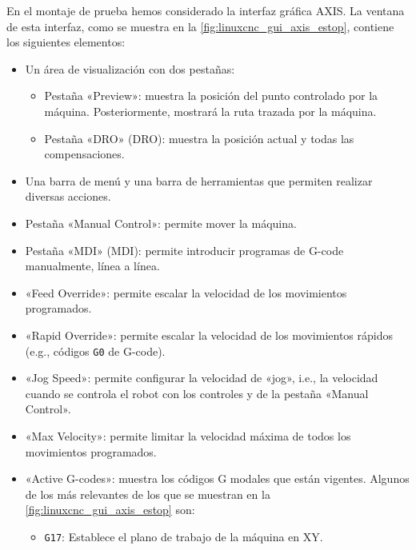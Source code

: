 \documentclass[english,spanish,a4paper,11pt]{article}
\begin{document}
En el montaje de prueba hemos considerado la interfaz gráfica AXIS. La ventana de esta interfaz, como se muestra en la \cref{fig:linuxcnc_gui_axis_estop}, contiene los siguientes elementos:
\begin{itemize}
    \item Un área de visualización con dos pestañas:
    \begin{itemize}
        \item Pestaña «Preview»: muestra la posición del punto controlado por la máquina. Posteriormente, mostrará la ruta trazada por la máquina.

        \item Pestaña «DRO» (\acl{DRO}): muestra la posición actual y todas las compensaciones.
    \end{itemize}

    \item Una barra de menú y una barra de herramientas que permiten realizar diversas acciones.
    
    \item Pestaña «Manual Control»: permite mover la máquina.

    \item Pestaña «MDI» (\acl{MDI}): permite introducir programas de G-code manualmente, línea a línea.
    
    \item «Feed Override»: permite escalar la velocidad de los movimientos programados.

    \item «Rapid Override»: permite escalar la velocidad de los movimientos rápidos (e.g., códigos \texttt{G0} de G-code).
    
    \item «Jog Speed»: permite configurar la velocidad de «jog», i.e., la velocidad cuando se controla el robot con los controles \button{-} y \button{+} de la pestaña «Manual Control».
    
    \item «Max Velocity»: permite limitar la velocidad máxima de todos los movimientos programados.
    
    \item «Active G-codes»: muestra los códigos G modales que están vigentes. Algunos de los más relevantes de los que se muestran en la \cref{fig:linuxcnc_gui_axis_estop} son:
    \begin{itemize}
        \item \texttt{G17}: Establece el plano de trabajo de la máquina en XY. 
        

\end{itemize}
\end{itemize}
\end{document}
